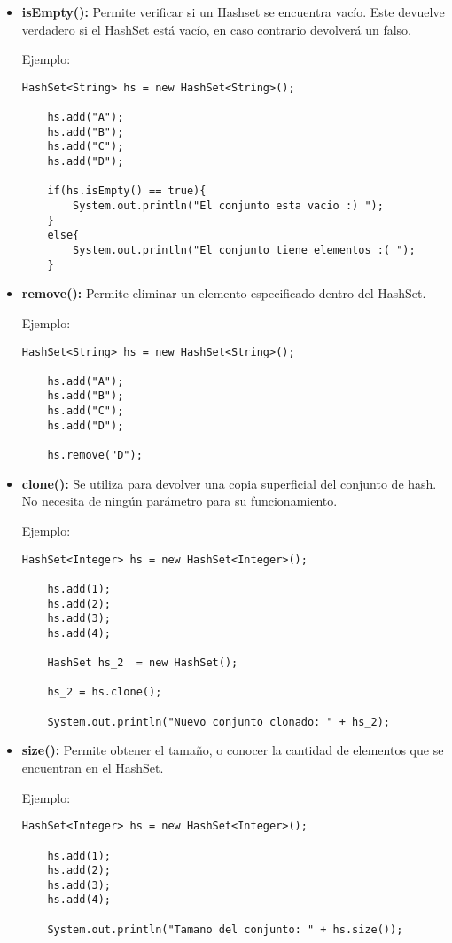 \documentclass[12pt, letterpaper]{article} %
\begin{document}
\begin{itemize}
    \item \textbf{isEmpty():} Permite verificar si un Hashset se encuentra vacío. Este devuelve verdadero si el HashSet está vacío, en caso contrario devolverá un falso.

    Ejemplo:
    \lstset{language = Java, breaklines=true, basicstyle=\footnotesize}
    \begin{lstlisting}[frame=single]
    HashSet<String> hs = new HashSet<String>();

    hs.add("A");
    hs.add("B");
    hs.add("C");
    hs.add("D");

    if(hs.isEmpty() == true){
        System.out.println("El conjunto esta vacio :) ");
    }
    else{
    	System.out.println("El conjunto tiene elementos :( ");
    }
    \end{lstlisting}

    \item \textbf{remove():} Permite eliminar un elemento especificado dentro del HashSet.

    Ejemplo:
    \lstset{language = Java, breaklines=true, basicstyle=\footnotesize}
    \begin{lstlisting}[frame=single]
    HashSet<String> hs = new HashSet<String>();

    hs.add("A");
    hs.add("B");
    hs.add("C");
    hs.add("D");

    hs.remove("D");
    \end{lstlisting}

    \item \textbf{clone():} Se utiliza para devolver una copia superficial del conjunto de hash. No necesita de ningún parámetro para su funcionamiento.

    Ejemplo:
    \lstset{language = Java, breaklines=true, basicstyle=\footnotesize}
    \begin{lstlisting}[frame=single]
    HashSet<Integer> hs = new HashSet<Integer>();

    hs.add(1);
    hs.add(2);
    hs.add(3);
    hs.add(4);

    HashSet hs_2  = new HashSet();

    hs_2 = hs.clone();

    System.out.println("Nuevo conjunto clonado: " + hs_2);
    \end{lstlisting}

    \item \textbf{size():} Permite obtener el tamaño, o conocer la cantidad de elementos que se encuentran en el HashSet.

    Ejemplo:
    \lstset{language = Java, breaklines=true, basicstyle=\footnotesize}
    \begin{lstlisting}[frame=single]
    HashSet<Integer> hs = new HashSet<Integer>();

    hs.add(1);
    hs.add(2);
    hs.add(3);
    hs.add(4);

    System.out.println("Tamano del conjunto: " + hs.size());
    \end{lstlisting}
\end{itemize}
\end{document}
